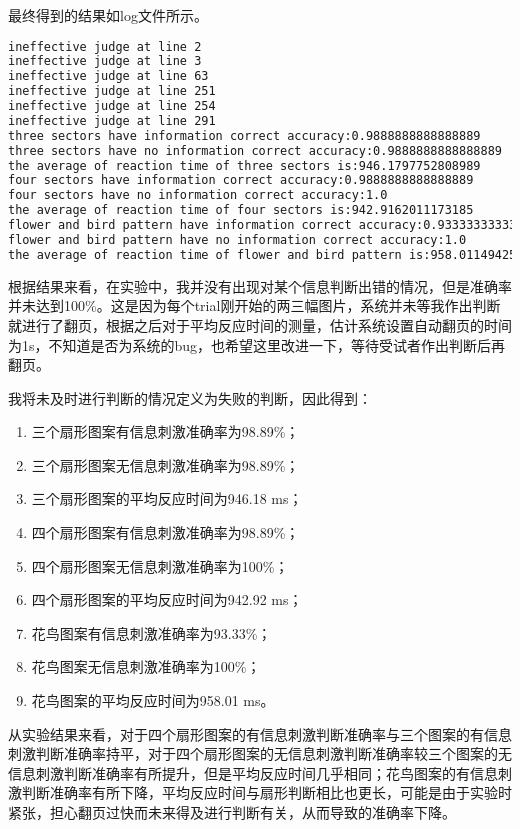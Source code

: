 \documentclass{hitreport}
\begin{document}
最终得到的结果如log文件所示。
\begin{lstlisting}[language=bash]
ineffective judge at line 2
ineffective judge at line 3
ineffective judge at line 63
ineffective judge at line 251
ineffective judge at line 254
ineffective judge at line 291
three sectors have information correct accuracy:0.9888888888888889
three sectors have no information correct accuracy:0.9888888888888889
the average of reaction time of three sectors is:946.1797752808989
four sectors have information correct accuracy:0.9888888888888889
four sectors have no information correct accuracy:1.0
the average of reaction time of four sectors is:942.9162011173185
flower and bird pattern have information correct accuracy:0.9333333333333333
flower and bird pattern have no information correct accuracy:1.0
the average of reaction time of flower and bird pattern is:958.0114942528736

\end{lstlisting}

根据结果来看，在实验中，我并没有出现对某个信息判断出错的情况，但是准确率并未达到100\%。这是因为每个trial刚开始的两三幅图片，系统并未等我作出判断就进行了翻页，根据之后对于平均反应时间的测量，估计系统设置自动翻页的时间为1s，不知道是否为系统的bug，也希望这里改进一下，等待受试者作出判断后再翻页。

我将未及时进行判断的情况定义为失败的判断，因此得到：
\begin{enumerate}
\item 三个扇形图案有信息刺激准确率为98.89\%；
\item 三个扇形图案无信息刺激准确率为98.89\%；
\item 三个扇形图案的平均反应时间为946.18 ms；
\item 四个扇形图案有信息刺激准确率为98.89\%；
\item 四个扇形图案无信息刺激准确率为100\%；
\item 四个扇形图案的平均反应时间为942.92 ms；
\item 花鸟图案有信息刺激准确率为93.33\%；
\item 花鸟图案无信息刺激准确率为100\%；
\item 花鸟图案的平均反应时间为958.01 ms。
\end{enumerate}

从实验结果来看，对于四个扇形图案的有信息刺激判断准确率与三个图案的有信息刺激判断准确率持平，对于四个扇形图案的无信息刺激判断准确率较三个图案的无信息刺激判断准确率有所提升，但是平均反应时间几乎相同；花鸟图案的有信息刺激判断准确率有所下降，平均反应时间与扇形判断相比也更长，可能是由于实验时紧张，担心翻页过快而未来得及进行判断有关，从而导致的准确率下降。
\end{document}
